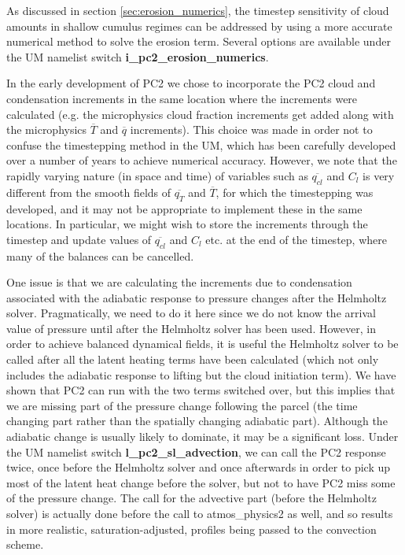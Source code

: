 \documentclass{UMDP_article}
\begin{document}
As discussed in section \ref{sec:erosion_numerics}, the timestep sensitivity
of cloud amounts in shallow cumulus regimes can be addressed by using
a more accurate numerical method to solve the erosion term.
Several options are available under the UM namelist switch
\textbf{i\_pc2\_erosion\_numerics}.

In the early development of PC2 we chose to incorporate the PC2 cloud
and condensation increments in the same location where the increments
were calculated (e.g. the microphysics cloud fraction increments
get added along with the microphysics $\overline{T}$ and $\overline{q}$
increments). This choice was made in order not to confuse the timestepping
method in the UM, which has been carefully developed over a number of
years to achieve numerical accuracy. However, we note that the rapidly
varying nature (in space and time) of variables such as $\overline{q_{cl}}$
and $C_l$ is very different from the smooth fields of $\overline{q_T}$ and
$\overline{T}$, for which the timestepping was developed, and it may
not be appropriate to implement these in the same locations. In
particular, we might wish to store the increments through the timestep
and update values of $\overline{q_{cl}}$ and $C_l$ etc. at the end
of the timestep, where many of the balances can be cancelled.

One issue is that we are calculating the increments due to condensation
associated with the adiabatic response to pressure changes after the
Helmholtz solver. Pragmatically, we need to do it here since we do not know
the arrival value of pressure until after the Helmholtz solver has been
used. However, in order to achieve balanced dynamical fields, it is useful
the Helmholtz solver to be called after all the latent heating terms have
been calculated (which not only includes the adiabatic response to
lifting but the cloud initiation term). We have shown that PC2 can run with
the two terms switched over, but this implies that we are missing part of
the pressure change following the parcel (the time changing part
rather than the spatially changing adiabatic part). Although the adiabatic
change is usually likely to dominate, it may be a significant loss.
Under the UM namelist switch \textbf{l\_pc2\_sl\_advection},
we can call the PC2 response twice, once before the Helmholtz solver and
once afterwards in order to pick up most of the latent heat change before
the solver, but not to have PC2 miss some of the pressure change.
The call for the advective part (before the Helmholtz solver) is
actually done before the call to atmos\_physics2 as well, and so results in
more realistic, saturation-adjusted, profiles being passed to the convection
scheme.
\end{document}

